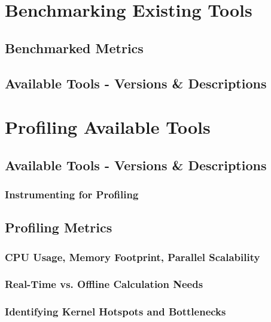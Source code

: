 \chapter{Benchmarking Existing Tools}
\section{Benchmarked Metrics}
\section{Available Tools - Versions \& Descriptions}

\chapter{Profiling Available Tools}
\section{Available Tools - Versions \& Descriptions}
\subsection{Instrumenting for Profiling}
\section{Profiling Metrics}
\subsection{CPU Usage, Memory Footprint, Parallel Scalability}
\subsection{Real-Time vs. Offline Calculation Needs}
\subsection{Identifying Kernel Hotspots and Bottlenecks}